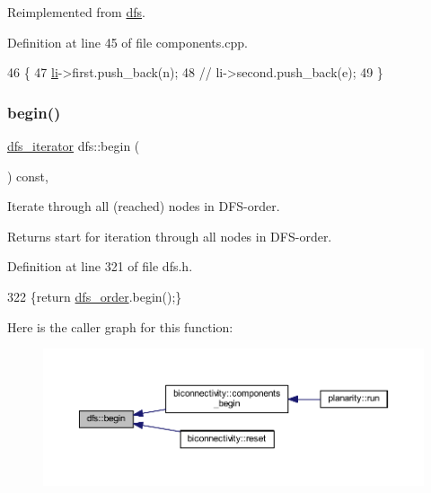 Reimplemented from \mbox{\hyperlink{classdfs_a401190846f59af2a49ba036e99230152}{dfs}}.



Definition at line 45 of file components.\+cpp.


\begin{DoxyCode}
46 \{
47     \mbox{\hyperlink{classcomponents_ae88ffb062b1ea4931ecfaa53e871825f}{li}}->first.push\_back(n);
48     \textcolor{comment}{// li->second.push\_back(e);    }
49 \}
\end{DoxyCode}
\mbox{\label{classdfs_ab06650dd8cbd5e76b0c73b71458ec5ec}} 
\subsubsection{\texorpdfstring{begin()}{begin()}}
{\footnotesize\ttfamily \mbox{\hyperlink{classdfs_a15fe023a5a1f7ddda00f3d87110d9a32}{dfs\+\_\+iterator}} dfs\+::begin (\begin{DoxyParamCaption}{ }\end{DoxyParamCaption}) const\hspace{0.3cm}{\ttfamily [inline]}, {\ttfamily [inherited]}}



Iterate through all (reached) nodes in D\+F\+S-\/order. 

\begin{DoxyReturn}{Returns}
start for iteration through all nodes in D\+F\+S-\/order. 
\end{DoxyReturn}


Definition at line 321 of file dfs.\+h.


\begin{DoxyCode}
322     \{\textcolor{keywordflow}{return} \mbox{\hyperlink{classdfs_af70a73ace68afd91ef944f984c9f28d5}{dfs\_order}}.begin();\}
\end{DoxyCode}
Here is the caller graph for this function\+:
\nopagebreak
\begin{figure}[H]
\begin{center}
\leavevmode
\includegraphics[width=350pt]{classdfs_ab06650dd8cbd5e76b0c73b71458ec5ec_icgraph}
\end{center}
\end{figure}
\mbox{\label{classdfs_a70862ea715c52eb95fb704afd3a6e676}} 
